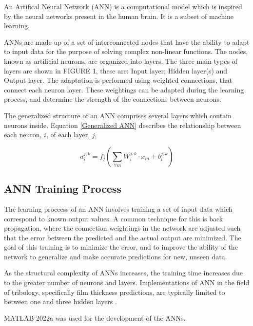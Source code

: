 An Artifical Neural Network (ANN) is a computational model which is inspired by the neural networks present in the human brain. It is a subset of machine learning.

ANNs are made up of a set of interconnected nodes that have the ability to adapt to input data for the purpose of solving complex non-linear functions. The nodes, known as artificial neurons, are organized into layers. The three main types of layers are shown in FIGURE 1, these are: Input layer; Hidden layer(s) and Output layer. The adaptation is performed using weighted connections, that connect each neuron layer. These weightings can be adapted during the learning process, and determine the strength of the connections between neurons.

The generalized structure of an ANN comprises several layers which contain neurons inside. Equation \ref{Generalized ANN} describes the relationship between each neuron, $i$, of each layer, $j$,

\begin{equation}\label{Generalized ANN}
	u_i^{j, k}=f_j\left(\sum_{\forall m} W_i^{j, k} \cdot x_m+b_i^{j, k}\right)
\end{equation}

\subsection{ANN Training Process}









The learning proccess of an ANN involves training a set of input data which correspond to known output values. A common technique for this is back propagation, where the connection weightings in the network are adjusted such that the error between the predicted and the actual output are minimized. The goal of this training is to minimize the error, and to improve the ability of the network to generalize and make accurate predictions for new, unseen data.

As the structural complexity of ANNs increases, the training time increases due to the greater number of neurons and layers. Implementations of ANN in the field of tribology, specifically film thickness predictions, are typically limited to between one and three hidden layers \cite{Marian2021}. 

MATLAB 2022a was used for the development of the ANNs.

